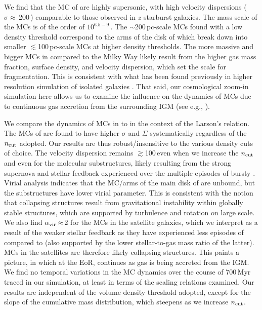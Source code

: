 \documentclass[iop]{emulateapj}
\begin{document}
We find that the MC of \flower are highly supersonic, with high velocity dispersions ($\sigma\approx$\,200\,\kms) comparable to 
those observed in $z$ starburst galaxies.
The mass scale of the MCs is of the order of $10^{6.5-9}$\,\Msun. The $\sim$200\,pc-scale MCs found with a low density threshold 
correspond to the arms of the disk of \flower which break down into smaller $\lesssim$100\,pc-scale MCs at higher density thresholds. 
The more massive and bigger MCs in \flower compared to the Milky Way 
likely result from the higher gas mass fraction, surface density, and velocity dispersion, 
which set the scale for fragmentation.
This is consistent with what has been found previously in higher resolution simulation of isolated galaxies \citep{}.
That said, our cosmological zoom-in simulation here allows us to examine 
the influence on the dynamics of MCs due to continuous gas accretion from the surrounding IGM (see e.g., \citealt{Klessen10a, Goldbaum11a}).

We compare the dynamics of MCs in \flower to \obs in the context of the Larson's relation.
The MCs of \flower are found to have higher $\sigma$ and $\Sigma$ systematically regardless of the $n_{\rm cut}$ adopted.
Our results are thus robust/insensitive to the various density cuts of choice.
The velocity dispersion remains $\gtrsim$100\,\kms even when we increase the $n_{\rm cut}$ and even for  
the molecular substructures, likely resulting from 
the strong supernova and stellar feedback \flower experienced over the multiple episodes of bursty \SF.
Virial analysis indicates that the MC/arms of the main disk of \flower are unbound, but the substructures have lower virial parameter. 
This is consistent with the notion that collapsing structures result from gravitational instability within globally stable structures, which are 
supported by turbulence and rotation on large scale.
We also find $\alpha_{\rm vir}\approx$2 for the MCs in the satellite galaxies, which we interpret as a result of the weaker stellar feedback as they have
experienced less episodes of \SF compared to \flower (also supported by the lower stellar-to-gas mass ratio of the latter).
MCs in the satellites are therefore likely collapsing structures. This paints a picture, in which at the EoR, \SF continues 
as gas is being accreted from the IGM.
We find no temporal variations in the MC dynamics over the course of 700\,Myr traced in our simulation, at least in terms of the scaling relations examined. 
Our results are independent of the volume density threshold adopted, except for the slope of the cumulative 
mass distribution, which steepens as we increase $n_{\rm cut}$. 
\end{document}

